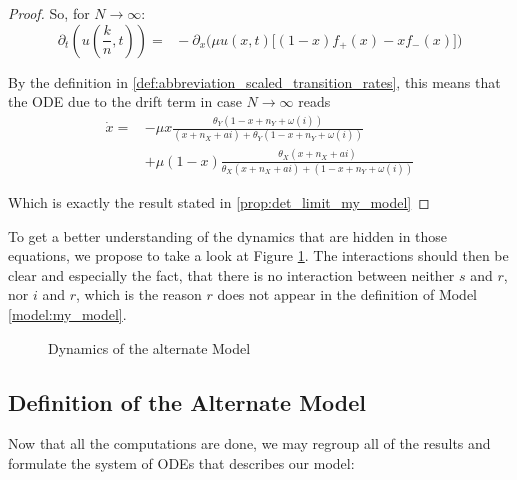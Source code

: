 \documentclass[12pt,a4paper,twoside]{article}
\begin{document}
\begin{proof}
	So, for $N \rightarrow \infty$:
	\begin{equation}
	\partial_t \left(u\left(\frac{k}{n}, t\right)\right)=\phantom{ll} -\partial_x\Big(\mu u(x,t)\big[(1-x)f_+(x) - xf_-(x)\big]\Big)
	\end{equation}
	
	By the definition in \eqref{def:abbreviation_scaled_transition_rates}, this means that the ODE due to the drift term in case $N \rightarrow \infty$ reads 
	\begin{align*}
	\dot{x} = &-\mu x\frac{\theta_Y(1-x+n_Y+\omega\left(i\right))}{(x+n_X+ai) + \theta_Y(1-x+n_Y+\omega\left(i\right))}\\
	\qquad&+ \mu \left(1-x\right)\frac{\theta_X (x+ n_X+ ai)}{\theta_X (x + n_X + ai) + (1-x + n_Y + \omega\left(i\right))}
	\end{align*}
	
	Which is exactly the result stated in \eqref{prop:det_limit_my_model}
\end{proof}

To get a better understanding of the dynamics that are hidden in those equations, we propose to take a look at Figure \ref{fig:my_model}. The interactions should then be clear and especially the fact, that there is no interaction between neither $s$ and $r$, nor $i$ and $r$, which is the reason $r$ does not appear in the definition of Model \ref{model:my_model}. 

\begin{figure}[h!]
	\centering
	\caption{Dynamics of the alternate Model}
	\label{fig:my_model}
	\def\svgwidth{450pt}
	
\end{figure}

\subsection{Definition of the Alternate Model}

Now that all the computations are done, we may regroup all of the results and formulate the system of \acp{ODE} that describes our model:
\end{document}
